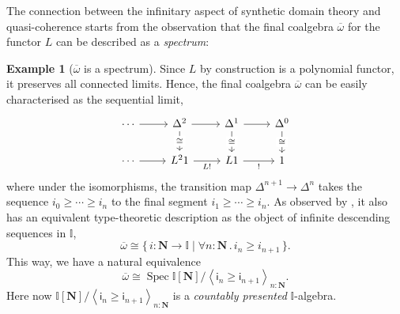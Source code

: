 \documentclass[a4paper,12pt]{amsart}
\theoremstyle{definition}
\newtheorem{example}[theorem]{Example}
\newcommand{\mb}[1]{\mathbf{#1}}
\newcommand{\mbb}[1]{\mathbb{#1}}
\newcommand{\I}{\mbb I}
\newcommand{\ms}[1]{\mathsf{#1}}
\newcommand{\ov}[1]{\overline{#1}}
\newcommand{\pair}[1]{\left\langle#1\right\rangle}
\newcommand{\scomp}[2]{\{\,#1\mid#2\,\}}
\newcommand{\N}{\mb N}
\newcommand{\fa}[2]{\forall #1\!\colon\!\!#2\mathpunct{.}}
\newcommand{\spec}{\operatorname{Spec}}
\begin{document}

The connection between the infinitary aspect of synthetic domain theory and quasi-coherence starts from the observation that the final coalgebra $\ov\omega$ for the functor $L$ can be described as a \emph{spectrum}:

\begin{example}[$\ov\omega$ is a spectrum]\label{exm:ovomegaaffine}
  Since $L$ by construction is a polynomial functor, it preserves all connected limits. Hence, the final coalgebra $\ov\omega$ can be easily characterised as the sequential limit, 
  \[\begin{tikzcd}
    \cdots & {\Delta^2} & {\Delta^1} & {\Delta^0} \\
    \cdots & {L^21} & L1 & 1
    \arrow[from=1-1, to=1-2]
    \arrow[from=1-2, to=1-3]
    \arrow["\cong"{description}, from=1-2, to=2-2]
    \arrow[from=1-3, to=1-4]
    \arrow["\cong"{description}, from=1-3, to=2-3]
    \arrow["\cong"{description}, from=1-4, to=2-4]
    \arrow[from=2-1, to=2-2]
    \arrow["{L!}"', from=2-2, to=2-3]
    \arrow["{!}"', from=2-3, to=2-4]
  \end{tikzcd}\]
  where under the isomorphisms, the transition map $\Delta^{n+1} \to \Delta^n$ takes the sequence $i_0 \ge \cdots \ge i_n$ to the final segment $i_1 \ge \cdots \ge i_n$. As observed by \citet[Sec.\ 5.2]{hyland1990first}, it also has an equivalent type-theoretic description as the object of infinite descending sequences in $\I$,
  \[ \ov\omega \cong \scomp{i : \N \to \I}{\fa n\N i_n \ge i_{n+1}}\text{.} \]
  This way, we have a natural equivalence
  \[ \ov\omega \cong \spec\I[\N]/\pair{\ms{i}_n \ge \ms{i}_{n+1}}_{n:\N}\text{.} \]
  Here now $\I[\N]/\pair{\ms{i}_n \ge \ms{i}_{n+1}}_{n:\N}$ is a \emph{countably presented} $\I$-algebra.
\end{example}
\end{document}
